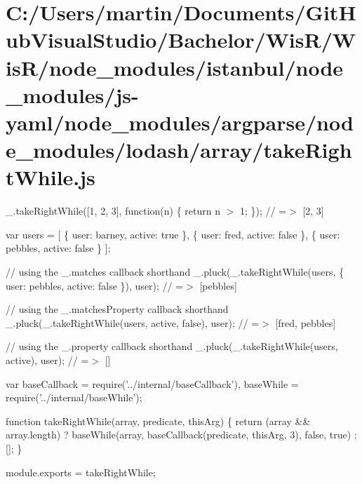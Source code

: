 \hypertarget{_c_1_2_users_2martin_2_documents_2_git_hub_visual_studio_2_bachelor_2_wis_r_2_wis_r_2node_module35d017b7e8d83542b3717c2509792d01}{}\section{C\+:/\+Users/martin/\+Documents/\+Git\+Hub\+Visual\+Studio/\+Bachelor/\+Wis\+R/\+Wis\+R/node\+\_\+modules/istanbul/node\+\_\+modules/js-\/yaml/node\+\_\+modules/argparse/node\+\_\+modules/lodash/array/take\+Right\+While.\+js}
\+\_\+.\+take\+Right\+While(\mbox{[}1, 2, 3\mbox{]}, function(n) \{ return n $>$ 1; \}); // =$>$ \mbox{[}2, 3\mbox{]}

var users = \mbox{[} \{ \textquotesingle{}user\textquotesingle{}\+: \textquotesingle{}barney\textquotesingle{}, \textquotesingle{}active\textquotesingle{}\+: true \}, \{ \textquotesingle{}user\textquotesingle{}\+: \textquotesingle{}fred\textquotesingle{}, \textquotesingle{}active\textquotesingle{}\+: false \}, \{ \textquotesingle{}user\textquotesingle{}\+: \textquotesingle{}pebbles\textquotesingle{}, \textquotesingle{}active\textquotesingle{}\+: false \} \mbox{]};

// using the {\ttfamily \+\_\+.\+matches} callback shorthand \+\_\+.\+pluck(\+\_\+.\+take\+Right\+While(users, \{ \textquotesingle{}user\textquotesingle{}\+: \textquotesingle{}pebbles\textquotesingle{}, \textquotesingle{}active\textquotesingle{}\+: false \}), \textquotesingle{}user\textquotesingle{}); // =$>$ \mbox{[}\textquotesingle{}pebbles\textquotesingle{}\mbox{]}

// using the {\ttfamily \+\_\+.\+matches\+Property} callback shorthand \+\_\+.\+pluck(\+\_\+.\+take\+Right\+While(users, \textquotesingle{}active\textquotesingle{}, false), \textquotesingle{}user\textquotesingle{}); // =$>$ \mbox{[}\textquotesingle{}fred\textquotesingle{}, \textquotesingle{}pebbles\textquotesingle{}\mbox{]}

// using the {\ttfamily \+\_\+.\+property} callback shorthand \+\_\+.\+pluck(\+\_\+.\+take\+Right\+While(users, \textquotesingle{}active\textquotesingle{}), \textquotesingle{}user\textquotesingle{}); // =$>$ \mbox{[}\mbox{]}


\begin{DoxyCodeInclude}
var baseCallback = require(\textcolor{stringliteral}{'../internal/baseCallback'}),
    baseWhile = require(\textcolor{stringliteral}{'../internal/baseWhile'});

\textcolor{keyword}{function} takeRightWhile(array, predicate, thisArg) \{
  \textcolor{keywordflow}{return} (array && array.length)
    ? baseWhile(array, baseCallback(predicate, thisArg, 3), \textcolor{keyword}{false}, \textcolor{keyword}{true})
    : [];
\}

module.exports = takeRightWhile;
\end{DoxyCodeInclude}
 